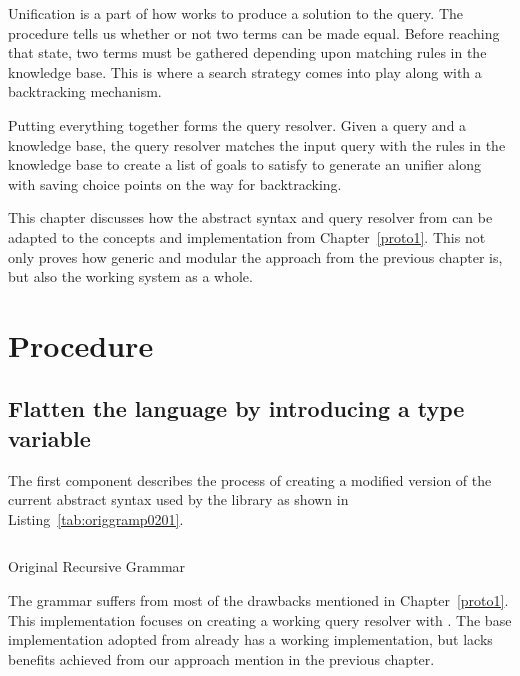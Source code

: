 \documentclass[thesis-solanki.tex]{subfiles}
\begin{document}
Unification is a part of how  works to produce a solution to the query.
The  procedure tells us whether or not two terms can be made equal.
Before reaching that state, two terms must be gathered depending upon matching rules in the knowledge base.
This is where a search strategy comes into play along with a backtracking mechanism.

Putting everything together forms the  query resolver.
Given a query and a knowledge base, the query resolver matches the input query with the rules in the knowledge base to
create a list of goals to satisfy to generate an unifier along with saving choice points on the way for
backtracking.

This chapter discusses how the abstract syntax and query resolver from \cite{prolog-lib} can be adapted to the
concepts and implementation from Chapter~\ref{proto1}.
This not only proves how generic and modular the approach from the previous chapter is, but also the working
 system as a whole.


\section{Procedure}


\subsection{Flatten the language by introducing a type variable}
The first component describes the process of creating a modified version of the current abstract syntax used by the
library as shown in Listing~\ref{tab:origgramp0201}.

\begin{code-list}[H]
	\begin{singlespace}
	\inputminted[linenos]{haskell}{haskell-proto2-original-grammar.hs}
	\end{singlespace}
	\caption{Original Recursive Grammar}
\label{tab:origgramp0201}
\end{code-list}

The grammar suffers from most of the drawbacks mentioned in Chapter~\ref{proto1}.
This implementation focuses on creating a working  query resolver with 
.
The base implementation adopted from  \cite{prolog-lib} already has a working
implementation, but lacks benefits achieved from our approach mention in the previous chapter.
\end{document}
